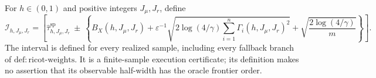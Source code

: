 For \(h\in(0,1)\) and positive integers \(J_\mu,J_r\), define
\[
\mathcal I_{h,J_\mu,J_r}=\left[
\widehat\tau^{\mathrm{sp}}_{h,J_\mu,J_r}
\ \pm\ \left\{
B_X(h,J_\mu,J_r)
+\varepsilon^{-1}\sqrt{2\log(4/\gamma)\sum_{i=1}^n\Gamma_i(h,J_\mu,J_r)^2}
+\sqrt{\frac{2\log(4/\gamma)}m}
\right\}\right].
\]
The interval is defined for every realized sample, including every fallback branch of \(\mathrm{def:ricot\text{-}weights}\). It is a finite-sample execution certificate; its definition makes no assertion that its observable half-width has the oracle frontier order.